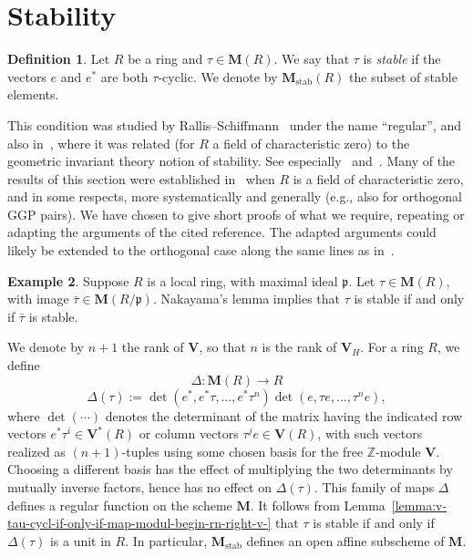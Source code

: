 \documentclass[reqno]{amsart}
\DeclareMathOperator{\stab}{stab}
\theoremstyle{plain} \newtheorem{theorem} {Theorem} \newtheorem{conjecture} {Conjecture} \newtheorem{corollary} [theorem] {Corollary} \newtheorem{proposition} [theorem] {Proposition} \newtheorem{fact} [theorem] {Fact}
\theoremstyle{definition} \newtheorem{definition} [theorem] {Definition}
\newtheorem{example} [theorem] {Example} \newtheorem{assertion}
\theoremstyle{itplain} %
\begin{document}
\section{Stability}\label{sec:20230514080526}
\begin{definition}
  Let $R$ be a ring and $\tau \in \mathbf{M}(R)$.  We say that $\tau$ is \emph{stable} if the vectors $e$ and $e^*$ are both $\tau$-cyclic.  We denote by $\mathbf{M}_{\stab}(R)$ the subset of stable elements.
\end{definition}
\begin{remark}
  This condition was studied by Rallis--Schiffmann~\cite{2007arXiv0705.2168R} under the name ``regular'', and also in~\cite[\S14]{nelson-venkatesh-1}, where it was related (for $R$ a field of characteristic zero) to the geometric invariant theory notion of stability.  See especially~\cite[Thm 6.1]{2007arXiv0705.2168R} and~\cite[Lem 14.8]{nelson-venkatesh-1}.  Many of the results of this section were established in~\cite[\S13-14]{nelson-venkatesh-1} when $R$ is a field of characteristic zero, and in some respects, more systematically and generally (e.g., also for orthogonal GGP pairs).  We have chosen to give short proofs of what we require, repeating or adapting the arguments of the cited reference.  The adapted arguments could likely be extended to the orthogonal case along the same lines as in~\cite[\S14]{nelson-venkatesh-1}.
\end{remark}
\begin{example}\label{example:cj3twmtcpz}
  Suppose $R$ is a local ring, with maximal ideal $\mathfrak{p}$.  Let $\tau \in \mathbf{M}(R)$, with image $\bar{\tau} \in \mathbf{M}(R/\mathfrak{p})$. Nakayama's lemma implies that $\tau$ is stable if and only if $\bar{\tau}$ is stable.
\end{example}
We denote by $n+1$ the rank of $\mathbf{V}$, so that $n$ is the rank of $\mathbf{V}_H$.  For a ring $R$, we define
\begin{equation*}
  \Delta : \mathbf{M}(R) \rightarrow R
\end{equation*}
\begin{equation*}
  \Delta(\tau) := \det (e^*, e^* \tau, \dotsc, e^* \tau ^n ) \det (e, \tau e, \dotsc, \tau ^n e),
\end{equation*}
where $\det(\dotsb)$ denotes the determinant of the matrix having the indicated row vectors $e^* \tau^i \in \mathbf{V}^*(R)$ or column vectors $\tau^j e \in \mathbf{V}(R)$, with such vectors realized as $(n+1)$-tuples using some chosen basis for the free $\mathbb{Z}$-module $\mathbf{V}$.  Choosing a different basis has the effect of multiplying the two determinants by mutually inverse factors, hence has no effect on $\Delta(\tau)$.  This family of maps $\Delta$ defines a regular function on the scheme $\mathbf{M}$.  It follows from Lemma~\ref{lemma:v-tau-cycl-if-only-if-map-modul-begin-rn-right-v-} that $\tau$ is stable if and only if $\Delta(\tau)$ is a unit in $R$.  In particular, $\mathbf{M} _{\stab}$ defines an open affine subscheme of $\mathbf{M}$.
\end{document}
